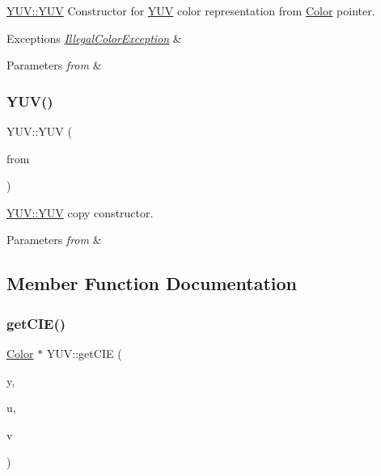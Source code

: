 \hyperlink{class_y_u_v_aafa9b0e5ddae51a501c13c9c4b106b84}{Y\+U\+V\+::\+Y\+UV} Constructor for \hyperlink{class_y_u_v}{Y\+UV} color representation from \hyperlink{class_color}{Color} pointer. 


\begin{DoxyExceptions}{Exceptions}
{\em \hyperlink{class_illegal_color_exception}{Illegal\+Color\+Exception}} & \\
\hline
\end{DoxyExceptions}

\begin{DoxyParams}{Parameters}
{\em from} & \\
\hline
\end{DoxyParams}
\mbox{\label{class_y_u_v_af6de31964471999a64e34af00ef6e196}} 
\subsubsection{\texorpdfstring{Y\+U\+V()}{YUV()}\hspace{0.1cm}{\footnotesize\ttfamily [3/3]}}
{\footnotesize\ttfamily Y\+U\+V\+::\+Y\+UV (\begin{DoxyParamCaption}\item[{const \hyperlink{class_y_u_v}{Y\+UV} \&}]{from }\end{DoxyParamCaption})}



\hyperlink{class_y_u_v_aafa9b0e5ddae51a501c13c9c4b106b84}{Y\+U\+V\+::\+Y\+UV} copy constructor. 


\begin{DoxyParams}{Parameters}
{\em from} & \\
\hline
\end{DoxyParams}


\subsection{Member Function Documentation}
\mbox{\label{class_y_u_v_a56f11c27f1659c30ebd20c929704e004}} 
\subsubsection{\texorpdfstring{get\+C\+I\+E()}{getCIE()}}
{\footnotesize\ttfamily \hyperlink{class_color}{Color} $\ast$ Y\+U\+V\+::get\+C\+IE (\begin{DoxyParamCaption}\item[{double}]{y,  }\item[{double}]{u,  }\item[{double}]{v }\end{DoxyParamCaption})}



